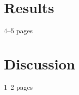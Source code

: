 \begin{chapterpage} %
\end{chapterpage}
\section{Results}
4--5 pages
\section{Discussion}
1--2 pages
